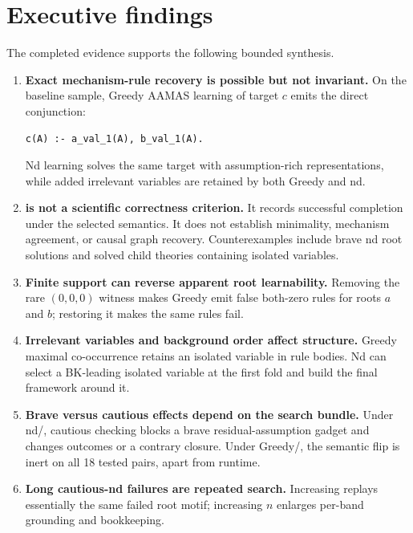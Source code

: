\documentclass[11pt]{article}
\DeclareRobustCommand{\code}[1]{\texttt{\detokenize{#1}}}
\begin{document}
\tableofcontents
\newpage

\section*{Executive findings}

The completed evidence supports the following bounded synthesis.

\begin{enumerate}
  \item \textbf{Exact mechanism-rule recovery is possible but not invariant.}
  On the baseline sample, Greedy AAMAS learning of target \(c\) emits the
  direct conjunction:
\begin{lstlisting}
c(A) :- a_val_1(A), b_val_1(A).
\end{lstlisting}
  Nd learning solves the same target with assumption-rich representations,
  while added irrelevant variables are retained by both Greedy and nd.

  \item \textbf{\code{solved} is not a scientific correctness criterion.}
  It records successful completion under the selected semantics. It does not
  establish minimality, mechanism agreement, or causal graph recovery.
  Counterexamples include brave nd root solutions and solved child theories
  containing isolated variables.

  \item \textbf{Finite support can reverse apparent root learnability.}
  Removing the rare \((0,0,0)\) witness makes Greedy emit false both-zero
  rules for roots \(a\) and \(b\); restoring it makes the same rules fail.

  \item \textbf{Irrelevant variables and background order affect structure.}
  Greedy maximal co-occurrence retains an isolated variable in rule bodies.
  Nd can select a BK-leading isolated variable at the first fold and build the
  final framework around it.

  \item \textbf{Brave versus cautious effects depend on the search bundle.}
  Under nd/\code{relto}, cautious checking blocks a brave residual-assumption
  gadget and changes outcomes or a contrary closure. Under
  Greedy/\code{relto}, the semantic flip is inert on all 18 tested pairs,
  apart from runtime.

  \item \textbf{Long cautious-nd failures are repeated search.}
  Increasing \code{folding_steps} replays essentially the same failed root
  motif; increasing \(n\) enlarges per-band grounding and bookkeeping.


\end{enumerate}
\end{document}

